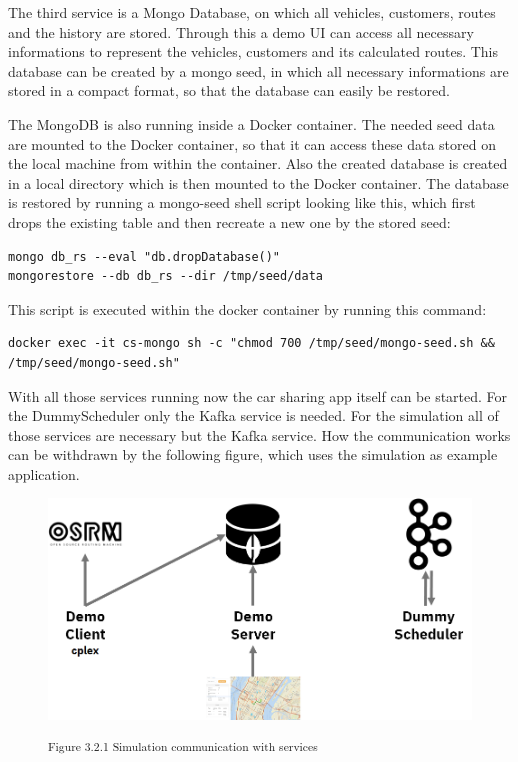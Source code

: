The third service is a Mongo Database, on which all vehicles, customers, routes and the history are stored. Through this a demo UI can access all necessary informations to represent the vehicles, customers and its calculated routes. This database can be created by a mongo seed, in which all necessary informations are stored in a compact format, so that the database can easily be restored. 

The MongoDB is also running inside a Docker container. The needed seed data are mounted to the Docker container, so that it can access these data stored on the local machine from within the container. Also the created database is created in a local directory which is then mounted to the Docker container. The database is restored by running a mongo-seed shell script looking like this, which first drops the existing table and then recreate a new one by the stored seed:


\begin{lstlisting}
mongo db_rs --eval "db.dropDatabase()"
mongorestore --db db_rs --dir /tmp/seed/data
\end{lstlisting}

This script is executed within the docker container by running this command:

\begin{lstlisting}
docker exec -it cs-mongo sh -c "chmod 700 /tmp/seed/mongo-seed.sh && /tmp/seed/mongo-seed.sh"
\end{lstlisting}

With all those services running now the car sharing app itself can be started. For the DummyScheduler only the Kafka service is needed. For the simulation all of those services are necessary but the Kafka service. How the communication works can be withdrawn by the following figure, which uses the simulation as example application.

\begin{figure}[h]
\centering
\includegraphics[width=\textwidth/5*4]{images/simulation_communication.png}

\textsuperscript{Figure 3.2.1 Simulation communication with services}\\
\end{figure}

